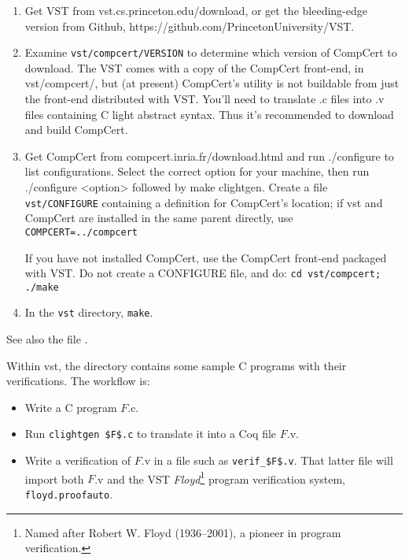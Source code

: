 \documentclass[12pt,fleqn,openany,oneside,showtrims]{memoir}
\begin{document}
\begin{enumerate}\setlength\itemsep{0pt}
\item  Get VST from \textsf{vst.cs.princeton.edu/download},
or get the bleeding-edge version from Github,\newline
\textsf{https://github.com/PrincetonUniversity/VST}.
\item Examine \lstinline{vst/compcert/VERSION} to determine which
version of CompCert to download.
The VST comes with a copy of the CompCert front-end, in vst/compcert/,
but (at present) CompCert's  utility is not buildable
from just the front-end distributed with VST.  You'll need 
to translate .c files into .v files containing C light abstract syntax.
Thus it's recommended to download
and build CompCert.

\item Get CompCert from \textsf{compcert.inria.fr/download.html}
and run \textsf{./configure} to list configurations. Select the correct option
for your machine, then run \textsf{./configure <option>} followed by \newline
\textsf{make clightgen}.
Create a file \lstinline{vst/CONFIGURE} containing a definition for CompCert's location;
if vst and CompCert are installed in the same
parent directly, use \lstinline{COMPCERT=../compcert}

If you have  not installed CompCert,
use the CompCert front-end packaged with VST.
Do not create a CONFIGURE file, and do:\newline
\lstinline{cd vst/compcert; ./make}  

\item In the \lstinline{vst} directory, \lstinline{make}.
\end{enumerate}
See also the file .

Within vst, the  directory contains some sample C programs
with their verifications.  The workflow is:
\begin{itemize}
\item Write a C program $F$.c.
\item Run \lstinline{clightgen $F$.c} to translate it into a Coq
file $F$.v.
\item Write a verification of $F$.v in a file such as
\lstinline{verif_$F$.v}.  That latter file will import
both $F$.v and the VST \emph{Floyd}\footnote{Named after Robert W. Floyd (1936--2001), a pioneer in program verification.} program verification system,
\lstinline{floyd.proofauto}.
\end{itemize}
\end{document}
